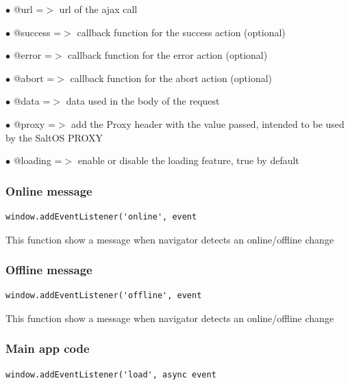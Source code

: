 \documentclass[a4paper]{article}
\begin{document}
\begin{compactitem}
\item[\color{myblue}$\bullet$] @url     =$>$ url of the ajax call
\item[\color{myblue}$\bullet$] @success =$>$ callback function for the success action (optional)
\item[\color{myblue}$\bullet$] @error   =$>$ callback function for the error action (optional)
\item[\color{myblue}$\bullet$] @abort   =$>$ callback function for the abort action (optional)
\item[\color{myblue}$\bullet$] @data    =$>$ data used in the body of the request
\item[\color{myblue}$\bullet$] @proxy   =$>$ add the Proxy header with the value passed, intended to be used by the SaltOS PROXY
\item[\color{myblue}$\bullet$] @loading =$>$ enable or disable the loading feature, true by default
\end{compactitem}

\hypertarget{toc20}{}
\subsubsection{Online message}

\begin{lstlisting}
window.addEventListener('online', event
\end{lstlisting}

This function show a message when navigator detects an online/offline change

\hypertarget{toc21}{}
\subsubsection{Offline message}

\begin{lstlisting}
window.addEventListener('offline', event
\end{lstlisting}

This function show a message when navigator detects an online/offline change

\hypertarget{toc22}{}
\subsubsection{Main app code}

\begin{lstlisting}
window.addEventListener('load', async event
\end{lstlisting}
\end{document}
